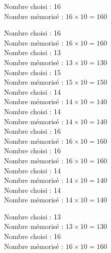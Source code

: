 \documentclass[a4paper,11pt,fleqn]{article}
\begin{document}
\bigskip
Nombre choisi : 16 \\
Nombre mémorisé : $16\times10=160$ \\

\bigskip

\newpage
\setcounter{exo}{0}
\setcounter{section}{0}

Nombre choisi : 16 \\
Nombre mémorisé : $16\times10=160$ \\

\bigskip
Nombre choisi : 13 \\
Nombre mémorisé : $13\times10=130$ \\

\bigskip
Nombre choisi : 15 \\
Nombre mémorisé : $15\times10=150$ \\

\bigskip
Nombre choisi : 14 \\
Nombre mémorisé : $14\times10=140$ \\

\bigskip
Nombre choisi : 14 \\
Nombre mémorisé : $14\times10=140$ \\

\bigskip
Nombre choisi : 16 \\
Nombre mémorisé : $16\times10=160$ \\

\bigskip
Nombre choisi : 16 \\
Nombre mémorisé : $16\times10=160$ \\

\bigskip
Nombre choisi : 14 \\
Nombre mémorisé : $14\times10=140$ \\

\bigskip
Nombre choisi : 14 \\
Nombre mémorisé : $14\times10=140$ \\

\bigskip

\newpage
\setcounter{exo}{0}
\setcounter{section}{0}

Nombre choisi : 13 \\
Nombre mémorisé : $13\times10=130$ \\

\bigskip
Nombre choisi : 16 \\
Nombre mémorisé : $16\times10=160$ \\
\end{document}
